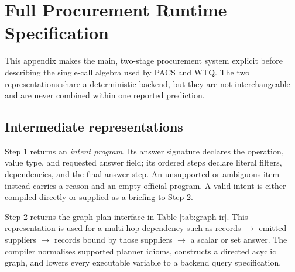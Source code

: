 \section{Full Procurement Runtime Specification}
\label{app:runtime}

This appendix makes the main, two-stage procurement system explicit before describing the
single-call algebra used by PACS and WTQ.  The two representations share a deterministic backend,
but they are not interchangeable and are never combined within one reported prediction.

\subsection{Intermediate representations}

Step 1 returns an \emph{intent program}.  Its answer signature declares the operation, value type,
and requested answer field; its ordered steps declare literal filters, dependencies, and the final
answer step.  An unsupported or ambiguous item instead carries a reason and an empty official
program.  A valid intent is either compiled directly or supplied as a briefing to Step 2.

Step 2 returns the graph-plan interface in Table \ref{tab:graph-ir}.  This representation is used
for a multi-hop dependency such as records $\rightarrow$ emitted suppliers $\rightarrow$ records
bound by those suppliers $\rightarrow$ a scalar or set answer.  The compiler normalises supported
planner idioms, constructs a directed acyclic graph, and lowers every executable variable to a
backend query specification.

